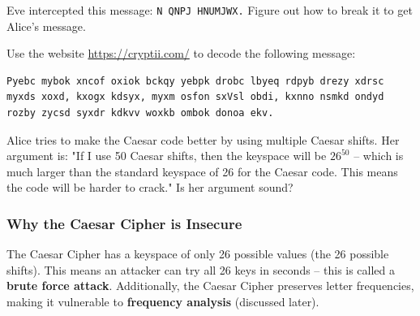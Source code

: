 \documentclass[11pt,a4paper]{report}
\begin{document}
\begin{ex}
Eve intercepted this message: \verb|N QNPJ HNUMJWX.|
Figure out how to break it to get Alice's message.
\end{ex}


\begin{ex}
Use the website \url{https://cryptii.com/} to decode the following message:
\begin{verbatim}
Pyebc mybok xncof oxiok bckqy yebpk drobc lbyeq rdpyb drezy xdrsc
myxds xoxd, kxogx kdsyx, myxm osfon sxVsl obdi, kxnno nsmkd ondyd
rozby zycsd syxdr kdkvv woxkb ombok donoa ekv.
\end{verbatim}
\end{ex}

\begin{ex}
Alice tries to make the Caesar code better by using multiple Caesar shifts.
Her argument is: "If I use 50 Caesar shifts,  then the keyspace will be $26^{50}$ -- which is much larger than the standard keyspace of 26 for the Caesar code.  This means the code will be harder to crack."
Is her argument sound?
\end{ex}

\subsubsection{Why the Caesar Cipher is Insecure}

The Caesar Cipher has a keyspace of only 26 possible values (the 26 possible shifts). This means an attacker can try all 26 keys in seconds -- this is called a \textbf{brute force attack}. Additionally, the Caesar Cipher preserves letter frequencies, making it vulnerable to \textbf{frequency analysis} (discussed later).
\end{document}
